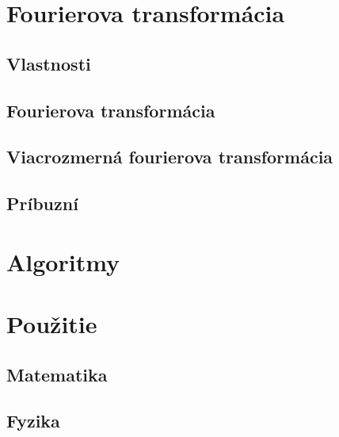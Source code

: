 



\chapter{Fourierova transformácia}
    
    
    
\section{Vlastnosti}
\section{Fourierova transformácia}
\section{Viacrozmerná fourierova transformácia}
\section{Príbuzní}

\chapter{Algoritmy}
    
    
    
    
    
    
    
    
    
    

\chapter{Použitie}
\section{Matematika}
    
    
    
    
    
         
\section{Fyzika}
    
    
    
    
    
